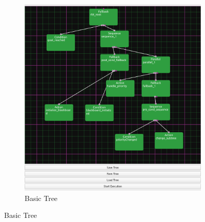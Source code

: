 \documentclass[report]{iisthesis}
\begin{document}
\begin{figure}[h]
    \centering
    \begin{subfigure}[b]{.45\linewidth}
    \includegraphics[width=\linewidth]{basicTree.png}
    \caption{Basic Tree}
    \end{subfigure}


\end{figure}
\end{document}
